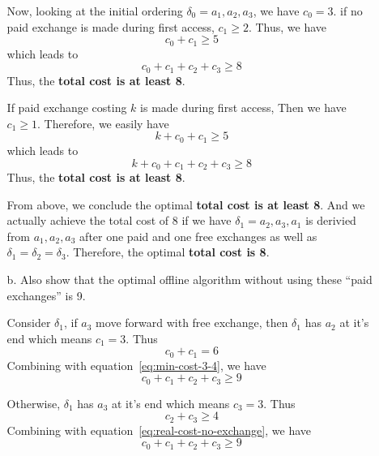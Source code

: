 \documentclass[12pt]{article}
\begin{document}
\begin{enumerate}
\begin{itemize}
Now, looking at the initial ordering $\delta_{0} = a_{1},a_{2},a_{3}$, we have $c_{0} = 3$. if no paid exchange is made during first access, $c_{1} \geq 2$. Thus, we have
\begin{equation} \label{eq:real-cost-no-exchange}
c_{0} + c_{1} \geq 5
\end{equation}
which leads to
\begin{equation}
c_{0} + c_{1} + c_{2} + c_{3} \geq 8
\end{equation}
Thus, the \textbf{total cost is at least 8}.

If paid exchange costing $k$ is made during first access, Then we have $c_{1} \geq 1$. Therefore, we easily have
\begin{equation} \label{eq:real-cost-pay}
k + c_{0} + c_{1} \geq 5
\end{equation}
which leads to
\begin{equation}
k + c_{0} + c_{1} + c_{2} + c_{3} \geq 8
\end{equation}
Thus, the \textbf{total cost is at least 8}.

From above, we conclude the optimal \textbf{total cost is at least 8}. And we actually achieve the total cost of 8 if we have $\delta_{1} = a_{2},a_{3},a_{1}$ is derivied from $a_{1},a_{2},a_{3}$ after one paid and one free exchanges as well as $\delta_{1} = \delta_{2} = \delta_{3}$. Therefore, the optimal \textbf{total cost is 8}.

\item[b.] Also show that the optimal offline algorithm without using these “paid exchanges” is 9.

Consider $\delta_{1}$, if $a_{3}$ move forward with free exchange, then $\delta_{1}$ has $a_{2}$ at it's end which means $c_{1} = 3$. Thus
\begin{equation} \label{eq:real-cost-move}
c_{0} + c_{1} = 6
\end{equation}
Combining with equation~\ref{eq:min-cost-3-4}, we have
\begin{equation}
c_{0} + c_{1} + c_{2} + c_{3} \geq 9
\end{equation}

Otherwise, $\delta_{1}$ has $a_{3}$ at it's end which means $c_{3} = 3$. Thus
\begin{equation} \label{eq:real-cost-3-4}
c_{2} + c_{3} \geq 4
\end{equation}
Combining with equation~\ref{eq:real-cost-no-exchange}, we have
\begin{equation}
c_{0} + c_{1} + c_{2} + c_{3} \geq 9
\end{equation}


\end{itemize}
\end{enumerate}
\end{document}
